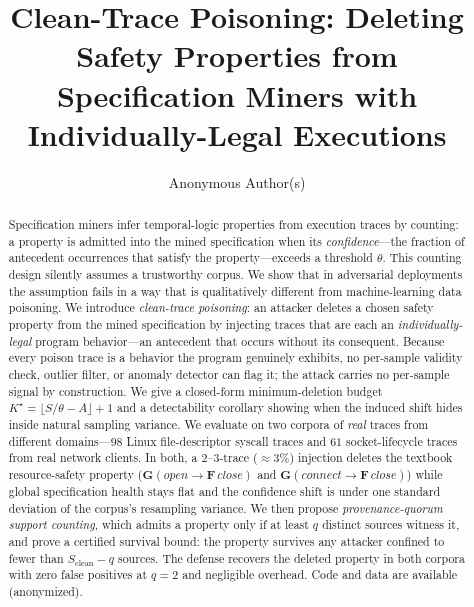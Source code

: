\documentclass[runningheads]{llncs}
\begin{document}
\title{Clean-Trace Poisoning: Deleting Safety Properties from\\
Specification Miners with Individually-Legal Executions}

\author{Anonymous Author(s)}

\maketitle

\begin{abstract}
Specification miners infer temporal-logic properties from execution traces by
counting: a property is admitted into the mined specification when its
\emph{confidence}---the fraction of antecedent occurrences that satisfy the
property---exceeds a threshold $\theta$. This counting design silently assumes a
trustworthy corpus. We show that in adversarial deployments the assumption fails
in a way that is qualitatively different from machine-learning data poisoning.
We introduce \emph{clean-trace poisoning}: an attacker deletes a chosen safety
property from the mined specification by injecting traces that are each an
\emph{individually-legal} program behavior---an antecedent that occurs without
its consequent. Because every poison trace is a behavior the program genuinely
exhibits, no per-sample validity check, outlier filter, or anomaly detector can
flag it; the attack carries no per-sample signal by construction. We give a
closed-form minimum-deletion budget $K^\star=\lfloor S/\theta - A\rfloor+1$ and a
detectability corollary showing when the induced shift hides inside natural
sampling variance. We evaluate on two corpora of \emph{real} traces from
different domains---$98$ Linux file-descriptor syscall traces and $61$
socket-lifecycle traces from real network clients. In both, a $2$--$3$-trace
($\approx 3\%$) injection deletes the textbook resource-safety property
($\mathbf{G}(\mathit{open}\!\rightarrow\!\mathbf{F}\,\mathit{close})$ and
$\mathbf{G}(\mathit{connect}\!\rightarrow\!\mathbf{F}\,\mathit{close})$) while
global specification health stays flat and the confidence shift is under one
standard deviation of the corpus's resampling variance. We then propose
\emph{provenance-quorum support counting}, which admits a property only if at
least $q$ distinct sources witness it, and prove a certified survival bound: the
property survives any attacker confined to fewer than $S_{\mathrm{clean}}-q$
sources. The defense recovers the deleted property in both corpora with zero
false positives at $q{=}2$ and negligible overhead. Code and data are available
(anonymized).
\end{abstract}
\end{document}
